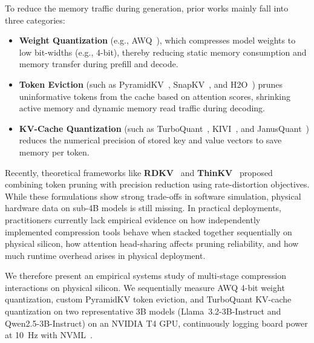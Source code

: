 \documentclass[sigconf,nonacm]{acmart}
\begin{document}
To reduce the memory traffic during generation, prior works mainly fall into three categories:
\begin{itemize}\raggedright
  \item \textbf{Weight Quantization} (e.g., AWQ~\cite{lin_awq_2025}), which compresses model weights to low bit-widths (e.g., 4-bit), thereby reducing static memory consumption and memory transfer during prefill and decode.
  \item \textbf{Token Eviction} (such as PyramidKV~\cite{cai_pyramidkv_2025}, SnapKV~\cite{li_snapkv_2024}, and H2O~\cite{zhang_h2o_2023}) prunes uninformative tokens from the cache based on attention scores, shrinking active memory and dynamic memory read traffic during decoding.
  \item \textbf{KV-Cache Quantization} (such as TurboQuant~\cite{zandieh2026turboquant}, KIVI~\cite{liu_kivi_2023}, and JanusQuant~\cite{sun2026janusquant}) reduces the numerical precision of stored key and value vectors to save memory per token.
\end{itemize}

\begingroup\raggedright
Recently, theoretical frameworks like \textbf{RDKV}~\cite{zhang_rdkv_2026} and \textbf{ThinKV}~\cite{ramachandran_thinkv_2026} proposed combining token pruning with precision reduction using rate-distortion objectives. While these formulations show strong trade-offs in software simulation, physical hardware data on sub-4B models is still missing. In practical deployments, practitioners currently lack empirical evidence on how independently implemented compression tools behave when stacked together sequentially on physical silicon, how attention head-sharing affects pruning reliability, and how much runtime overhead arises in physical deployment.
\par\endgroup

We therefore present an empirical systems study of multi-stage compression interactions on physical silicon. We sequentially measure AWQ 4-bit weight quantization, custom PyramidKV token eviction, and TurboQuant KV-cache quantization on two representative 3B models (Llama~3.2-3B-Instruct and Qwen2.5-3B-Instruct) on an NVIDIA T4 GPU, continuously logging board power at 10~Hz with NVML~\cite{argerich_watt_2026,nvidia2024nvml}.
\end{document}
